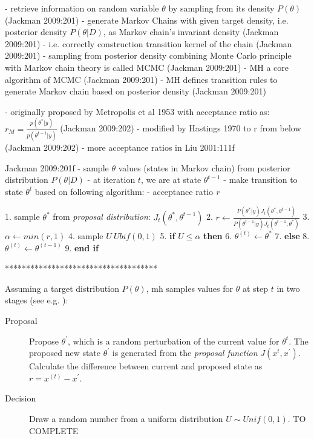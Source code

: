 \documentclass[11pt]{article}
\begin{document}
- retrieve information on random variable $\theta$ by sampling from its density $P(\theta)$ (Jackman 2009:201)
- generate Markov Chains with given target density, i.e. posterior density $P(\theta|D)$, as Markov chain's invariant density (Jackman 2009:201)
- i.e. correctly construction transition kernel of the chain (Jackman 2009:201)
- sampling from posterior density combining Monte Carlo principle with Markov chain theory is called MCMC (Jackman 2009:201)
- MH a core algorithm of MCMC (Jackman 2009:201)
- MH defines transition rules to generate Markov chain based on posterior density (Jackman 2009:201)


- originally proposed by Metropolis et al 1953 with acceptance ratio as:
$r_M = \frac{p(\theta^*|y)}{p(\theta^{t-1}|y)}$ (Jackman 2009:202)
- modified by Hastings 1970 to r from below (Jackman 2009:202)
- more acceptance ratios in Liu 2001:111f


Jackman 2009:201f
- sample $\theta$ values (states in Markov chain) from posterior distribution $P(\theta|D)$
- at iteration $t$, we are at state $\theta^{t-1}$
- make transition to state $\theta^t$ based on following algorithm:
- acceptance ratio \textit{r}

1. sample $\theta^*$ from \textit{proposal distribution}: $J_t(\theta^*, \theta^{t-1})$
2. $r \leftarrow \frac{P(\theta^*|y) J_t(\theta^*, \theta^{t-1})}{P(\theta^{t-1}|y) J_t(\theta^{t-1}, \theta^*)}$
3. $\alpha \leftarrow min(r, 1)$
4. sample $U ~ Ubif(0,1)$
5. \textbf{if} $U \leq \alpha$ \textbf{then}
6. $\theta^{(t)} \leftarrow \theta^*$
7. \textbf{else}
8. $\theta^{(t)} \leftarrow \theta^(t-1)$
9. \textbf{end if}


************************************

Assuming a target distribution $P(\theta)$, \gls{mh} samples values for $\theta$ at step $t$ in two stages (see e.g. \cite[][106f]{liu2001}): %
\begin{description}
\item[Proposal] Propose $\theta^'$, which is a random perturbation of the current value for $\theta^t$.  The proposed new state $\theta^'$ is generated from the \textit{proposal function} $J(x^{t}, x^{'})$. Calculate the difference between current and proposed state as $ r = x^{(t)} - x^{'} $.
\item[Decision] Draw a random number from a uniform distribution $U \sim Unif(0,1)$. TO COMPLETE
\end{description}
\end{document}
